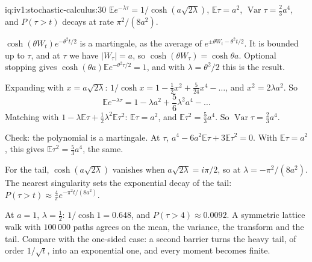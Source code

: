 \begin{solution}{iq:iv1:stochastic-calculus:30}
$\mathbb{E}e^{-\lambda\tau} = 1/\cosh(a\sqrt{2\lambda})$, $\mathbb{E}\tau = a^2$, $\operatorname{Var}\tau = \frac23a^4$, and $P(\tau > t)$ decays at rate $\pi^2/(8a^2)$.

$\cosh(\theta W_t)e^{-\theta^2t/2}$ is a martingale, as the average of $e^{\pm\theta W_t - \theta^2t/2}$. It is bounded up to $\tau$, and at $\tau$ we have $|W_\tau| = a$, so $\cosh(\theta W_\tau) = \cosh\theta a$. Optional stopping gives $\cosh(\theta a)\mathbb{E}e^{-\theta^2\tau/2} = 1$, and with $\lambda = \theta^2/2$ this is the result.

Expanding with $x = a\sqrt{2\lambda}$: $1/\cosh x = 1 - \frac12x^2 + \frac{5}{24}x^4 - \dots$, and $x^2 = 2\lambda a^2$. So
\[
\mathbb{E}e^{-\lambda\tau} = 1 - \lambda a^2 + \frac56\lambda^2a^4 - \dots
\]
Matching with $1 - \lambda\mathbb{E}\tau + \frac12\lambda^2\mathbb{E}\tau^2$: $\mathbb{E}\tau = a^2$, and $\mathbb{E}\tau^2 = \frac53a^4$. So $\operatorname{Var}\tau = \frac23a^4$.

Check: the polynomial is a martingale. At $\tau$, $a^4 - 6a^2\mathbb{E}\tau + 3\mathbb{E}\tau^2 = 0$. With $\mathbb{E}\tau = a^2$, this gives $\mathbb{E}\tau^2 = \frac53a^4$, the same.

For the tail, $\cosh(a\sqrt{2\lambda})$ vanishes when $a\sqrt{2\lambda} = i\pi/2$, so at $\lambda = -\pi^2/(8a^2)$. The nearest singularity sets the exponential decay of the tail: $P(\tau > t) \approx \frac{4}{\pi}e^{-\pi^2t/(8a^2)}$.

At $a = 1$, $\lambda = \frac12$: $1/\cosh 1 = 0.648$, and $P(\tau > 4) \approx 0.0092$. A symmetric lattice walk with $100\,000$ paths agrees on the mean, the variance, the transform and the tail. Compare with the one-sided case: a second barrier turns the heavy tail, of order $1/\sqrt{t}$, into an exponential one, and every moment becomes finite.



\end{solution}
